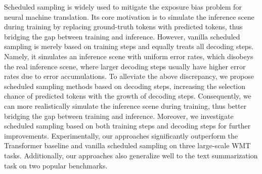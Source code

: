 Scheduled sampling is widely used to mitigate the exposure bias problem for neural machine translation. Its core motivation is to simulate the inference scene during training by replacing ground-truth tokens with predicted tokens, thus bridging the gap between training and inference. However, vanilla scheduled sampling is merely based on training steps and equally treats all decoding steps. Namely, it simulates an inference scene with uniform error rates, which disobeys the real inference scene, where larger decoding steps usually have higher error rates due to error accumulations. To alleviate the above discrepancy, we propose scheduled sampling methods based on decoding steps, increasing the selection chance of predicted tokens with the growth of decoding steps. Consequently, we can more realistically simulate the inference scene during training, thus better bridging the gap between training and inference. Moreover, we investigate scheduled sampling based on both training steps and decoding steps for further improvements. Experimentally, our approaches significantly outperform the Transformer baseline and vanilla scheduled sampling on three large-scale WMT tasks. Additionally, our approaches also generalize well to the text summarization task on two popular benchmarks.
